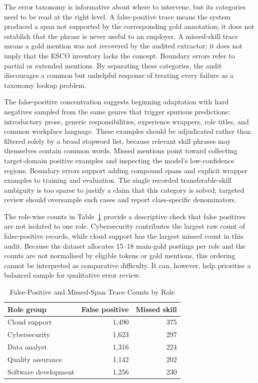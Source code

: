 \documentclass[conference]{IEEEtran}
\begin{document}
The error taxonomy is informative about where to intervene, but its categories need to be read at the right level. A false-positive trace means the system produced a span not supported by the corresponding gold annotation; it does not establish that the phrase is never useful to an employer. A missed-skill trace means a gold mention was not recovered by the audited extractor; it does not imply that the ESCO inventory lacks the concept. Boundary errors refer to partial or extended mentions. By separating these categories, the audit discourages a common but unhelpful response of treating every failure as a taxonomy lookup problem.

The false-positive concentration suggests beginning adaptation with hard negatives sampled from the same genres that trigger spurious predictions: introductory prose, generic responsibilities, experience wrappers, role titles, and common workplace language. These examples should be adjudicated rather than filtered solely by a broad stopword list, because relevant skill phrases may themselves contain common words. Missed mentions point toward collecting target-domain positive examples and inspecting the model's low-confidence regions. Boundary errors support adding compound spans and explicit wrapper examples to training and evaluation. The single recorded transferable-skill ambiguity is too sparse to justify a claim that this category is solved; targeted review should oversample such cases and report class-specific denominators.

The role-wise counts in Table~\ref{tab:role-errors} provide a descriptive check that false positives are not isolated to one role. Cybersecurity contributes the largest raw count of false-positive records, while cloud support has the largest missed count in this audit. Because the dataset allocates 15--18 main-gold postings per role and the counts are not normalised by eligible tokens or gold mentions, this ordering cannot be interpreted as comparative difficulty. It can, however, help prioritise a balanced sample for qualitative error review.

\begin{table}[!t]
\caption{False-Positive and Missed-Span Trace Counts by Role}
\label{tab:role-errors}
\centering
\small
\begin{tabular}{lrr}
\toprule
Role group & False positive & Missed skill \\
\midrule
Cloud support & 1,490 & 375 \\
Cybersecurity & 1,623 & 297 \\
Data analyst & 1,316 & 224 \\
Quality assurance & 1,142 & 202 \\
Software development & 1,256 & 230 \\
\bottomrule
\end{tabular}
\\[1mm]
\par\vspace{1mm}{\footnotesize Counts are audit records, not role-normalised rates. Source: current Irish trace audit.}
\end{table}
\end{document}
